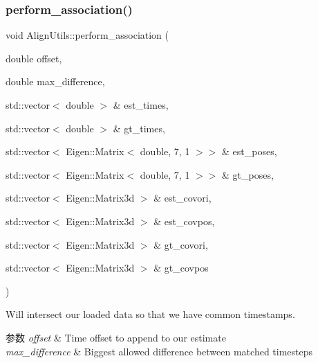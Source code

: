 \subsubsection{\texorpdfstring{perform\+\_\+association()}{perform\_association()}\hspace{0.1cm}{\footnotesize\ttfamily [2/2]}}
{\footnotesize\ttfamily void Align\+Utils\+::perform\+\_\+association (\begin{DoxyParamCaption}\item[{double}]{offset,  }\item[{double}]{max\+\_\+difference,  }\item[{std\+::vector$<$ double $>$ \&}]{est\+\_\+times,  }\item[{std\+::vector$<$ double $>$ \&}]{gt\+\_\+times,  }\item[{std\+::vector$<$ Eigen\+::\+Matrix$<$ double, 7, 1 $>$$>$ \&}]{est\+\_\+poses,  }\item[{std\+::vector$<$ Eigen\+::\+Matrix$<$ double, 7, 1 $>$$>$ \&}]{gt\+\_\+poses,  }\item[{std\+::vector$<$ Eigen\+::\+Matrix3d $>$ \&}]{est\+\_\+covori,  }\item[{std\+::vector$<$ Eigen\+::\+Matrix3d $>$ \&}]{est\+\_\+covpos,  }\item[{std\+::vector$<$ Eigen\+::\+Matrix3d $>$ \&}]{gt\+\_\+covori,  }\item[{std\+::vector$<$ Eigen\+::\+Matrix3d $>$ \&}]{gt\+\_\+covpos }\end{DoxyParamCaption})\hspace{0.3cm}{\ttfamily [static]}}



Will intersect our loaded data so that we have common timestamps. 


\begin{DoxyParams}{参数}
{\em offset} & Time offset to append to our estimate \\
\hline
{\em max\+\_\+difference} & Biggest allowed difference between matched timesteps \\
\hline
\end{DoxyParams}
